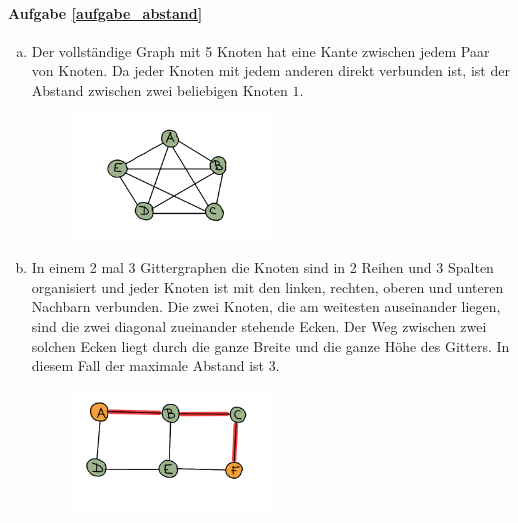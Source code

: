 \paragraph{Aufgabe \ref{aufgabe_abstand}}
\begin{enumerate}[(a)]
\item Der vollständige Graph mit 5 Knoten hat eine Kante zwischen jedem Paar von Knoten. Da jeder Knoten mit jedem anderen direkt verbunden ist, ist der Abstand zwischen zwei beliebigen Knoten \(1\).
\begin{figure}[H]
    \centering
    \includegraphics[width=0.5\textwidth]{Pictures/SP/abstand_k5.png}
\end{figure}

\item In einem 2 mal 3 Gittergraphen die Knoten sind in 2 Reihen und 3 Spalten organisiert und jeder Knoten ist mit den linken, rechten, oberen und unteren Nachbarn verbunden. Die zwei Knoten, die am weitesten auseinander liegen, sind die zwei diagonal zueinander stehende Ecken. Der Weg zwischen zwei solchen Ecken liegt durch die ganze Breite und die ganze Höhe des Gitters. In diesem Fall der maximale Abstand ist \(3\).
\begin{figure}[H]
    \centering
    \includegraphics[width=0.5\textwidth]{Pictures/SP/abstand_gitter23.png}
\end{figure}


\end{enumerate}
